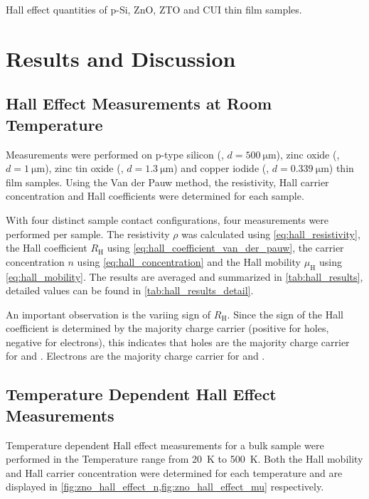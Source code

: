 \begin{table*}
	\centering	
		
	\caption{Hall effect quantities of p-Si, ZnO, ZTO and CUI thin film samples.}
	\label{tab:hall_results}
\end{table*}

\section{Results and Discussion}
\subsection{Hall Effect Measurements at Room Temperature}
Measurements were performed on p-type silicon (, $d=\qty{500}{\micro\meter}$), 
zinc oxide (, $d=\qty{1}{\micro\meter}$), zinc tin oxide (, 
$d=\qty{1.3}{\micro\meter}$) and copper iodide (, $d=\qty{0.339}{\micro\meter}$) 
thin film samples.
Using the Van der Pauw method, the resistivity, Hall carrier concentration and Hall coefficients 
were determined for each sample.

With four distinct sample contact configurations, four measurements were performed 
per sample. 
The resistivity $\rho$ was calculated using \cref{eq:hall_resistivity}, 
the Hall coefficient $R_{\mathrm{H}}$ using \cref{eq:hall_coefficient_van_der_pauw},
the carrier concentration $n$ using \cref{eq:hall_concentration} 
and the Hall mobility $\mu_{\mathrm{H}}$ using \cref{eq:hall_mobility}.
The results are averaged and summarized in \cref{tab:hall_results}, detailed values
can be found in \cref{tab:hall_results_detail}.

An important observation is the variing sign of $R_{\mathrm{H}}$. 
Since the sign of the Hall coefficient is determined by the majority charge carrier
(positive for holes, negative for electrons), this indicates that holes are the majority
charge carrier for  and . 
Electrons are the majority charge carrier for  and . 

\subsection{Temperature Dependent Hall Effect Measurements}
Temperature dependent Hall effect measurements for a bulk  sample 
were performed in the Temperature range from \qty{20}{\kelvin} to \qty{500}{\kelvin}.
Both the Hall mobility and Hall carrier concentration were determined for each temperature and are displayed in 
\cref{fig:zno_hall_effect_n,fig:zno_hall_effect_mu} respectively.

